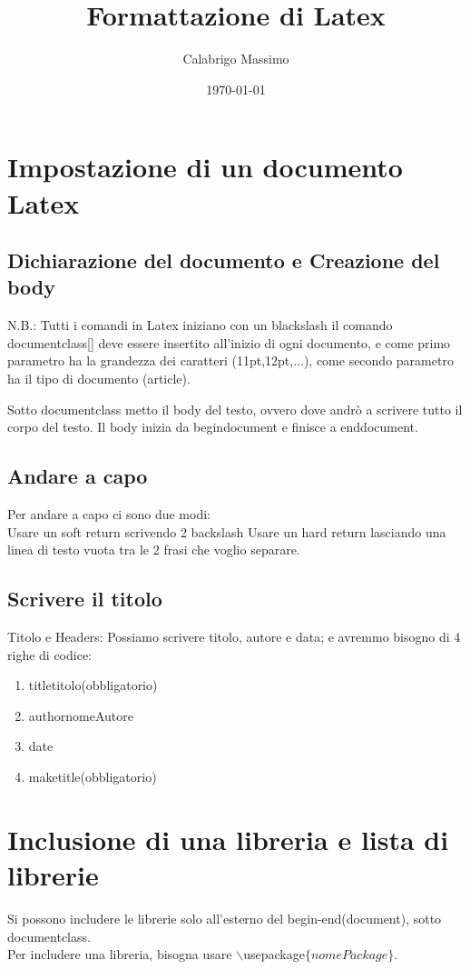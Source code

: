 \documentclass[11pt]{article}
\begin{document}
\title{Formattazione di Latex}
\author{Calabrigo Massimo}
\date{\today}
\maketitle

\tableofcontents

\section{Impostazione di un documento Latex}
\subsection{Dichiarazione del documento e Creazione del body}
N.B.: Tutti i comandi in Latex iniziano con un blackslash
il comando documentclass[]{} deve essere insertito all'inizio di ogni documento,
e come primo parametro ha la grandezza dei caratteri (11pt,12pt,...),
come secondo parametro ha il tipo di documento (article).

Sotto documentclass metto il body del testo, ovvero dove andrò a scrivere tutto il corpo del testo. Il body inizia da begin{document} e finisce a end{document}.\\
\subsection{Andare a capo}
Per andare a capo ci sono due modi:\\
Usare un soft return scrivendo 2 backslash
Usare un hard return lasciando una linea di testo vuota tra le 2 frasi che voglio separare.\\
\subsection{Scrivere il titolo}
Titolo e Headers: Possiamo scrivere titolo, autore e data; e avremmo bisogno di 4 righe di codice:\\
\begin{enumerate}
    \item title{titolo}(obbligatorio)
    \item author{nomeAutore}
    \item date
    \item maketitle(obbligatorio)
\end{enumerate}
\section{Inclusione di una libreria e lista di librerie}
Si possono includere le librerie solo all'esterno del begin-end(document), sotto documentclass.\\
Per includere una libreria, bisogna usare $\backslash$usepackage$\{nomePackage\}$.
\end{document}
